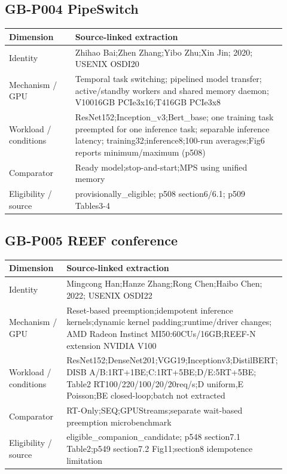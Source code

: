\documentclass[12pt,a4paper]{article}
\begin{document}
\subsection*{GB-P004 PipeSwitch}
\cite{GB-P004}

{\small\begin{longtable}{>{\raggedright\arraybackslash}p{0.22\linewidth}>{\raggedright\arraybackslash}p{0.7\linewidth}}
\toprule
Dimension & Source-linked extraction\\\midrule
\endhead
Identity & Zhihao Bai;Zhen Zhang;Yibo Zhu;Xin Jin; 2020; USENIX OSDI20\\
Mechanism /\allowbreak{} GPU & Temporal task switching; pipelined model transfer; active/\allowbreak{}standby workers and shared memory daemon; V10016GB PCIe3x16;T416GB PCIe3x8\\
Workload /\allowbreak{} conditions & ResNet152;Inception\_\allowbreak{}v3;Bert\_\allowbreak{}base; one training task preempted for one inference task; separable inference latency; training32;inference8;100-run averages;Fig6 reports minimum/\allowbreak{}maximum (p508)\\
Comparator & Ready model;stop-and-start;MPS using unified memory\\
Eligibility /\allowbreak{} source & provisionally\_\allowbreak{}eligible; p508 section6/\allowbreak{}6.1; p509 Tables3-4\\
\bottomrule
\end{longtable}}

\subsection*{GB-P005 REEF conference}
\cite{GB-P005}

{\small\begin{longtable}{>{\raggedright\arraybackslash}p{0.22\linewidth}>{\raggedright\arraybackslash}p{0.7\linewidth}}
\toprule
Dimension & Source-linked extraction\\\midrule
\endhead
Identity & Mingcong Han;Hanze Zhang;Rong Chen;Haibo Chen; 2022; USENIX OSDI22\\
Mechanism /\allowbreak{} GPU & Reset-based preemption;idempotent inference kernels;dynamic kernel padding;runtime/\allowbreak{}driver changes; AMD Radeon Instinct MI50:\allowbreak{}60CUs/\allowbreak{}16GB;REEF-N extension NVIDIA V100\\
Workload /\allowbreak{} conditions & ResNet152;DenseNet201;VGG19;Inceptionv3;DistilBERT; DISB A/\allowbreak{}B:\allowbreak{}1RT+1BE;C:\allowbreak{}1RT+5BE;D/\allowbreak{}E:\allowbreak{}5RT+5BE; Table2 RT100/\allowbreak{}220/\allowbreak{}100/\allowbreak{}20/\allowbreak{}20req/\allowbreak{}s;D uniform,E Poisson;BE closed-loop;batch not extracted\\
Comparator & RT-Only;SEQ;GPUStreams;separate wait-based preemption microbenchmark\\
Eligibility /\allowbreak{} source & eligible\_\allowbreak{}companion\_\allowbreak{}candidate; p548 section7.1 Table2;p549 section7.2 Fig11;section8 idempotence limitation\\
\bottomrule
\end{longtable}}
\end{document}
